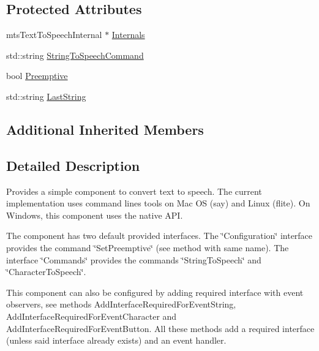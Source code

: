 \subsection*{Protected Attributes}
\begin{DoxyCompactItemize}
\item 
mts\-Text\-To\-Speech\-Internal $\ast$ \hyperlink{classmts_text_to_speech_a3ef89e41ddb760539b723b6c46f1b463}{Internals}
\item 
std\-::string \hyperlink{classmts_text_to_speech_aadd1b9d1f241afe95b2f2b7fa34422a8}{String\-To\-Speech\-Command}
\item 
bool \hyperlink{classmts_text_to_speech_a78a3e0004193dbd080e027c3b7a97fa8}{Preemptive}
\item 
std\-::string \hyperlink{classmts_text_to_speech_a8b6a91cf728698b9bd49ac8d888bbc48}{Last\-String}
\end{DoxyCompactItemize}
\subsection*{Additional Inherited Members}


\subsection{Detailed Description}
Provides a simple component to convert text to speech. The current implementation uses command lines tools on Mac O\-S (say) and Linux (flite). On Windows, this component uses the native A\-P\-I.

The component has two default provided interfaces. The \char`\"{}\-Configuration\char`\"{} interface provides the command \char`\"{}\-Set\-Preemptive\char`\"{} (see method with same name). The interface \char`\"{}\-Commands\char`\"{} provides the commands \char`\"{}\-String\-To\-Speech\char`\"{} and \char`\"{}\-Character\-To\-Speech\char`\"{}.

This component can also be configured by adding required interface with event observers, see methods Add\-Interface\-Required\-For\-Event\-String, Add\-Interface\-Required\-For\-Event\-Character and Add\-Interface\-Required\-For\-Event\-Button. All these methods add a required interface (unless said interface already exists) and an event handler. 

